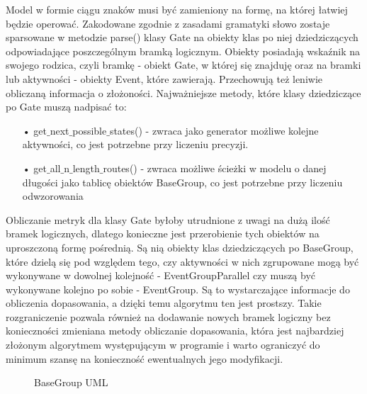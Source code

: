 Model w formie ciągu znaków musi być zamieniony na formę, na której łatwiej będzie operować. Zakodowane zgodnie z zasadami gramatyki słowo zostaje sparsowane w metodzie parse() klasy Gate na obiekty klas po niej dziedziczących odpowiadające poszczególnym bramką logicznym. Obiekty posiadają wskaźnik na swojego rodzica, czyli bramkę - obiekt Gate, w której się znajduję oraz na bramki lub aktywności - obiekty Event, które zawierają. Przechowują też leniwie obliczaną informacja o złożoności. Najważniejsze metody, które klasy dziedziczące po Gate muszą nadpisać to:
\begin{itemize}
  \item[•] get$\_$next$\_$possible$\_$states() - zwraca jako generator możliwe kolejne aktywności, co jest potrzebne przy liczeniu precyzji.
  \item[•] get$\_$all$\_$n$\_$length$\_$routes() - zwraca możliwe ścieżki w modelu o danej długości jako tablicę obiektów BaseGroup, co jest potrzebne przy liczeniu odwzorowania
\end{itemize}

Obliczanie metryk dla klasy Gate byłoby utrudnione z uwagi na dużą ilość bramek logicznych, dlatego konieczne jest przerobienie tych obiektów na uproszczoną formę pośrednią. Są nią obiekty klas dziedziczących po BaseGroup, które dzielą się pod względem tego, czy aktywności w nich zgrupowane mogą być wykonywane w dowolnej kolejność - EventGroupParallel czy muszą być wykonywane kolejno po sobie - EventGroup. Są to wystarczające informacje do obliczenia dopasowania, a dzięki temu algorytmu ten jest prostszy. Takie rozgraniczenie pozwala również na dodawanie nowych bramek logiczny bez konieczności zmieniana metody obliczanie dopasowania, która jest najbardziej złożonym algorytmem występującym w programie i warto ograniczyć do minimum szansę na konieczność ewentualnych jego modyfikacji. 

\begin{figure}[h]
	\caption{\label{fig:subcaption_example}BaseGroup UML}
\end{figure}

